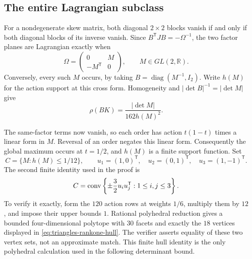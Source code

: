\subsection{The entire Lagrangian subclass}

For a nondegenerate skew matrix, both diagonal $2\times2$ blocks vanish
if and only if both diagonal blocks of its inverse vanish. Since
$B^{\mathsf T}JB=-\Omega^{-1}$, the two factor planes are Lagrangian exactly
when
\[
 \Omega=\begin{pmatrix}0&M\\-M^{\mathsf T}&0\end{pmatrix},\qquad
 M\in GL(2,\mathbb R).
\]
Conversely, every such $M$ occurs, by taking $B=\operatorname{diag}(M^{-1},I_2)$.
Write $h(M)$ for the action support at this cross form. Homogeneity and
$|\det B|^{-1}=|\det M|$ give
\begin{equation}\label{eq:triangles-cross-ratio}
 \rho(BK)=\frac{|\det M|}{162h(M)^2}.
\end{equation}

The same-factor terms now vanish, so each order has action
$t(1-t)$ times a linear form in $M$. Reversal of an order negates this
linear form. Consequently the global maximum occurs at $t=1/2$, and
$h(M)$ is a finite support function. Set
\[
 C=\{M:h(M)\leq1/12\},\qquad
 u_1=(1,0)^{\mathsf T},\quad u_2=(0,1)^{\mathsf T},\quad
 u_3=(1,-1)^{\mathsf T}.
\]
The second finite identity used in the proof is
\begin{equation}\label{eq:triangles-rankone-hull}
 C=\operatorname{conv}\left\{\pm\frac32u_i u_j^{\mathsf T}:1\leq i,j\leq3\right\}.
\end{equation}
To verify it exactly, form the $120$ action rows at weights $1/6$, multiply
them by $12$, and impose their upper bounds $1$. Rational polyhedral
reduction gives a bounded four-dimensional polytope with $30$ facets and
exactly the $18$ vertices displayed in \eqref{eq:triangles-rankone-hull}.
The verifier asserts equality of these two vertex sets, not an approximate
match. This finite hull identity is the only polyhedral calculation used
in the following determinant bound.

